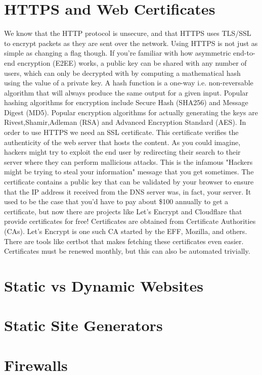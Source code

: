 \documentclass{article}
\begin{document}
\section{HTTPS and Web Certificates}

We know that the HTTP protocol is unsecure, and that HTTPS uses TLS/SSL to encrypt packets as they are sent over
the network. Using HTTPS is not just as simple as changing a flag though. If you're familiar with how
asymmetric end-to-end encryption (E2EE) works, a public key can be shared with any number of users, which can
only be decrypted with by computing a mathematical hash using the value of a private key. A hash function is a
one-way i.e. non-reversable algorithm that will always produce the same output for a given input. Popular
hashing algorithms for encryption include Secure Hash (SHA256) and Message Digest (MD5). Popular encryption
algorithms for actually generating the keys are Rivest,Shamir,Adleman (RSA) and Advanced Encryption Standard
(AES). In order to use HTTPS we need an SSL certificate. This certificate verifies the authenticity of the web
server that hosts the content. As you could imagine, hackers might try to exploit the end user by redirecting
their search to their server where they can perform mallicious attacks. This is the infamous "Hackers might be
trying to steal your information" message that you get sometimes. The certificate contains a public key that
can be validated by your browser to ensure that the IP address it received from the DNS server was, in fact,
your server. It used to be the case that you'd have to pay about \$100 annually to get a certificate, but now
there are projects like Let's Encrypt and Cloudflare that provide certificates for free! Certificates are
obtained from Certificate Authorities (CAs). Let's Encrypt is one such CA started by the EFF, Mozilla, and
others. There are tools like certbot that makes fetching these certificates even easier. Certificates must be
renewed monthly, but this can also be automated trivially.

\section{Static vs Dynamic Websites}

\section{Static Site Generators}

\section{Firewalls}
\end{document}
